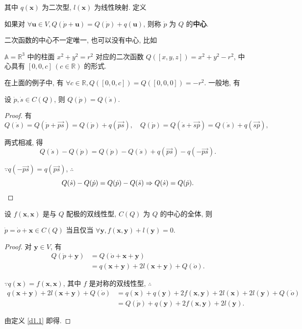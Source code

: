 \documentclass{ctexart}
\begin{document}
其中 $q(\boldsymbol{x})$ 为二次型, $l(\boldsymbol{x})$ 为线性映射. 定义
\begin{definition}\label{d1.1}
    如果对 $\forall\boldsymbol{u}\in V,Q(\dot{p}+\boldsymbol{u})=Q(\dot{p})+q(\boldsymbol{u})$, 则称 $\dot{p}$ 为 $Q$ 的\textbf{中心}.
\end{definition}
二次函数的中心不一定唯一, 也可以没有中心, 比如
\begin{example}
    $\mathbb{A}=\mathbb{R}^3$ 中的柱面 $x^2+y^2=r^2$ 对应的二次函数 $Q([x,y,z])=x^2+y^2-r^2$, 中心具有 $[0,0,c]\ (c\in\mathbb{R})$ 的形式.
\end{example}
在上面的例子中, 有 $\forall c\in\mathbb{R},Q([0,0,c])=Q([0,0,0])=-r^2$. 一般地, 有
\begin{theorem}\label{t1.1}
    设 $\dot{p},\dot{s}\in C(Q)$, 则 $Q(\dot{p})=Q(\dot{s})$.
\end{theorem}
\begin{proof}
    有
    \[Q(\dot{s})=Q(\dot{p}+\overrightarrow{ps})=Q(\dot{p})+q(\overrightarrow{ps}),\quad Q(\dot{p})=Q(\dot{s}+\overrightarrow{sp})=Q(\dot{s})+q(\overrightarrow{sp}),\]

    两式相减, 得
    \[Q(\dot{s})-Q(\dot{p})=Q(\dot{p})-Q(\dot{s})+q(\overrightarrow{ps})-q(-\overrightarrow{ps}).\]

    $\because q(-\overrightarrow{ps})=q(\overrightarrow{ps})$, $\therefore$
    \[Q(\dot{s})-Q(\dot{p})=Q(\dot{p})-Q(\dot{s})\Rightarrow Q(\dot{s})=Q(\dot{p}).\qedhere\]
\end{proof}
设 $f(\boldsymbol{x},\boldsymbol{x})$ 是与 $Q$ 配极的双线性型, $C(Q)$ 为 $Q$ 的中心的全体, 则
\begin{theorem}\label{t1.2}
    $\dot{p}=\dot{o}+\boldsymbol{x}\in C(Q)$ 当且仅当 $\forall\boldsymbol{y},f(\boldsymbol{x},\boldsymbol{y})+l(\boldsymbol{y})=0$.
\end{theorem}
\begin{proof}
    对 $\boldsymbol{y}\in V$, 有
    \begin{align*}
        Q(\dot{p}+\boldsymbol{y}) & =Q(\dot{o}+\boldsymbol{x}+\boldsymbol{y}) \\
        & =q(\boldsymbol{x}+\boldsymbol{y})+2l(\boldsymbol{x}+\boldsymbol{y})+Q(\dot{o}).
    \end{align*}

    $\because q(\boldsymbol{x})=f(\boldsymbol{x},\boldsymbol{x})$, 其中 $f$ 是对称的双线性型, $\therefore$
    \begin{align*}
        q(\boldsymbol{x}+\boldsymbol{y})+2l(\boldsymbol{x}+\boldsymbol{y})+Q(\dot{o}) & =q(\boldsymbol{x})+q(\boldsymbol{y})+2f(\boldsymbol{x},\boldsymbol{y})+2l(\boldsymbol{x})+2l(\boldsymbol{y})+Q(\dot{o}) \\
        & =Q(\dot{p})+q(\boldsymbol{y})+2f(\boldsymbol{x},\boldsymbol{y})+2l(\boldsymbol{y}).
    \end{align*}

    由定义 \ref{d1.1} 即得.
\end{proof}
\end{document}
